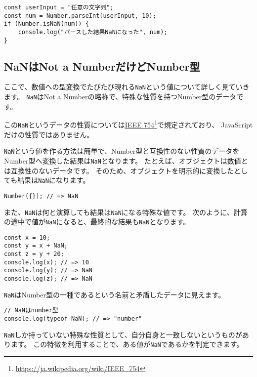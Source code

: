 \begin{lstlisting}
const userInput = "任意の文字列";
const num = Number.parseInt(userInput, 10);
if (Number.isNaN(num)) {
    console.log("パースした結果NaNになった", num);
}
\end{lstlisting}

\hypertarget{nan-is-number-type}{%
\subsection{NaNはNot a NumberだけどNumber型}\label{nan-is-number-type}}

ここで、数値への型変換でたびたび現れる\texttt{NaN}という値について詳しく見ていきます。
\texttt{NaN}はNot a
Numberの略称で、特殊な性質を持つNumber型のデータです。

この\texttt{NaN}というデータの性質については\href{https://ja.wikipedia.org/wiki/IEEE_754}{IEEE
754}\footnote{\url{https://ja.wikipedia.org/wiki/IEEE_754}}で規定されており、 JavaScriptだけの性質ではありません。

\texttt{NaN}という値を作る方法は簡単で、Number型と互換性のない性質のデータをNumber型へ変換した結果は\texttt{NaN}となります。
たとえば、オブジェクトは数値とは互換性のないデータです。
そのため、オブジェクトを明示的に変換したとしても結果は\texttt{NaN}になります。

\begin{lstlisting}
Number({}); // => NaN
\end{lstlisting}

また、\texttt{NaN}は何と演算しても結果は\texttt{NaN}になる特殊な値です。
次のように、計算の途中で値が\texttt{NaN}になると、最終的な結果も\texttt{NaN}となります。

\begin{lstlisting}
const x = 10;
const y = x + NaN;
const z = y + 20;
console.log(x); // => 10
console.log(y); // => NaN
console.log(z); // => NaN
\end{lstlisting}

\texttt{NaN}はNumber型の一種であるという名前と矛盾したデータに見えます。

\begin{lstlisting}
// NaNはnumber型
console.log(typeof NaN); // => "number"
\end{lstlisting}

\texttt{NaN}しか持っていない特殊な性質として、自分自身と一致しないというものがあります。
この特徴を利用することで、ある値が\texttt{NaN}であるかを判定できます。

